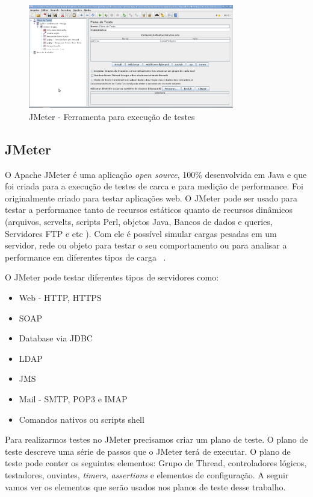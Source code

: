 	\begin{figure}[!htbp]
		\begin{center}
			\includegraphics[width=0.8\textwidth]{jmeter}
		\end{center}
		\caption{JMeter - Ferramenta para execução de testes ~\cite{siteJmeter}}
		\label{fig:jmeter}
	\end{figure}


\subsection{JMeter}

O Apache JMeter é uma aplicação \textit{open source}, 100\% desenvolvida em Java e que foi criada para a execução de testes de carca e para medição de performance. Foi originalmente criado para testar aplicações web. O JMeter pode ser usado para testar a performance tanto de recursos estáticos quanto de recursos dinâmicos  (arquivos, servelts, scripts Perl, objetos Java, Bancos de dados e queries, Servidores FTP e etc ). Com ele é possível simular cargas pesadas em um servidor, rede ou objeto para testar o seu comportamento ou para analisar a performance em diferentes tipos de carga ~\cite{siteJmeter}.

O JMeter pode testar diferentes tipos de servidores como:

\begin{itemize}
\item Web - HTTP, HTTPS
\item SOAP
\item Database via JDBC
\item LDAP
\item JMS
\item Mail - SMTP, POP3 e IMAP
\item Comandos nativos ou scripts shell
\end{itemize}

Para realizarmos testes no JMeter precisamos criar um plano de teste. O plano de teste descreve uma série de passos que o JMeter terá de executar. O plano de teste pode conter os seguintes elementos: Grupo de Thread, controladores lógicos, testadores, ouvintes, \textit{timers}, \textit{assertions} e elementos de configuração. A seguir vamos ver os elementos que serão usados nos planos de teste desse trabalho.

